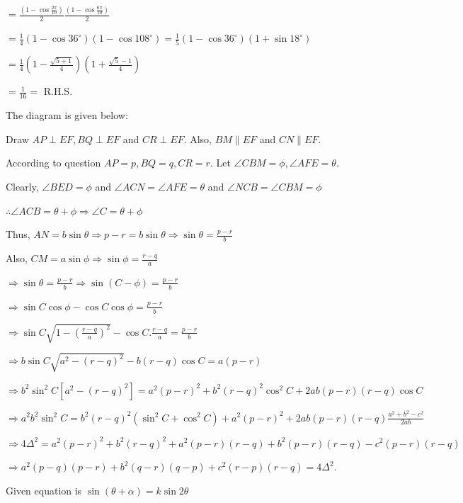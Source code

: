   $= \frac{\left(1 - \cos\frac{2\pi}{10}\right)}{2}\frac{\left(1 - \cos\frac{6\pi}{10}\right)}{2}$

  $= \frac{1}{4}\left(1 - \cos36^\circ\right)\left(1 - \cos108^\circ\right) = \frac{1}{5}\left(1
  - \cos36^\circ\right)\left(1 + \sin18^\circ\right)$

  $= \frac{1}{4}\left(1 - \frac{\sqrt{5 + 1}}{4}\right)\left(1 + \frac{\sqrt{5} - 1}{4}\right)$

  $= \frac{1}{16} =$ R.H.S.
\item The diagram is given below:

  \startplacefigure
    \externalfigure[17_1.pdf]
  \stopplacefigure

  Draw $AP\perp EF, BQ\perp EF$ and $CR\perp EF$. Also, $BM\parallel EF$ and $CN\parallel EF$.

  According to question $AP = p, BQ = q, CR = r$. Let $\angle CBM = \phi, \angle AFE = \theta$.

  Clearly, $\angle BED = \phi$ and $\angle ACN = \angle AFE = \theta$ and $\angle NCB = \angle CBM = \phi$

  $\therefore \angle ACB = \theta + \phi\Rightarrow \angle C = \theta + \phi$

  Thus, $AN = b\sin\theta \Rightarrow p - r = b\sin\theta \Rightarrow \sin\theta = \frac{p - r}{b}$

  Also, $CM = a\sin\phi \Rightarrow \sin\phi = \frac{r - q}{a}$

  $\Rightarrow \sin\theta = \frac{p - r}{b}\Rightarrow \sin(C - \phi) = \frac{p - r}{b}$

  $\Rightarrow \sin C\cos\phi - \cos C\cos\phi = \frac{p - r}{b}$

  $\Rightarrow \sin C\sqrt{1 - \left(\frac{r - q}{a}\right)^2} - \cos C.\frac{r - q}{a} = \frac{p - r}{b}$

  $\Rightarrow b\sin C\sqrt{a^2 - (r - q)^2} - b(r - q)\cos C = a(p - r)$

  $\Rightarrow b^2\sin^2C\left[a^2 - (r - q)^2\right] = a^2(p - r)^2 + b^2(r - q)^2\cos^2C + 2ab(p - r)(r -
  q)\cos C$

  $\Rightarrow a^2b^2\sin^2C = b^2(r - q)^2(\sin^2C + \cos^2C) + a^2(p - r)^2 + 2ab(p - r)(r - q)\frac{a^2
    + b^2 - c^2}{2ab}$

  $\Rightarrow 4\Delta^2 = a^2(p - r)^2 + b^2(r - q)^2 + a^2(p - r)(r - q) + b^2(p - r)(r - q) - c^2(p -
  r)(r - q)$

  $\Rightarrow a^2(p - q)(p - r) + b^2(q - r)(q - p) + c^2(r - p)(r - q) = 4\Delta^2$.
\item Given equation is $\sin(\theta + \alpha) = k\sin2\theta$


